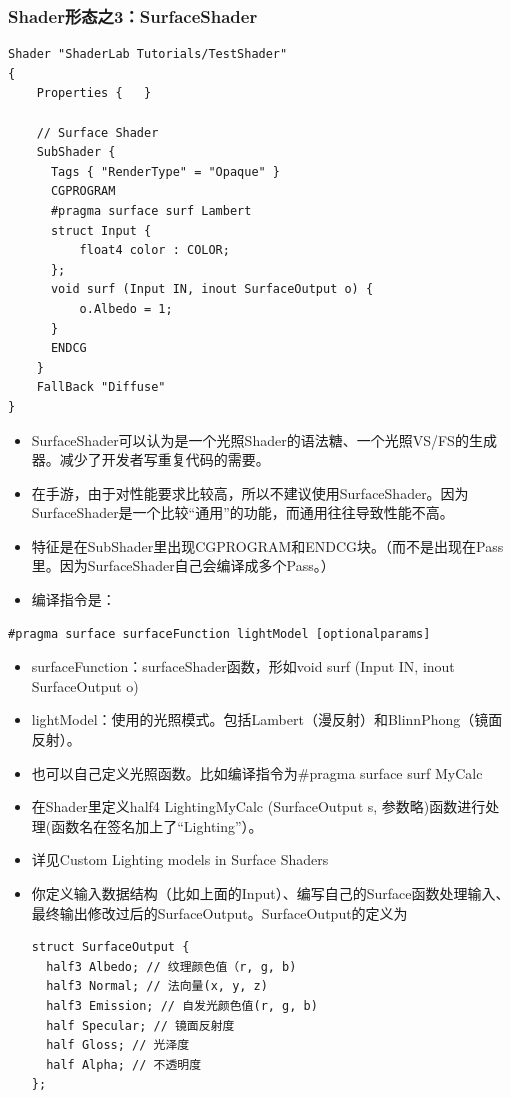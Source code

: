 \documentclass[9pt, b5paper]{article}
\begin{document}
\subsubsection{Shader形态之3：SurfaceShader}
\label{sec:org837e601}
\begin{verbatim}
Shader "ShaderLab Tutorials/TestShader"
{
    Properties {   }

    // Surface Shader
    SubShader {
      Tags { "RenderType" = "Opaque" }
      CGPROGRAM
      #pragma surface surf Lambert
      struct Input {
          float4 color : COLOR;
      };
      void surf (Input IN, inout SurfaceOutput o) {
          o.Albedo = 1;
      }
      ENDCG
    }
    FallBack "Diffuse"
}
\end{verbatim}
\begin{itemize}
\item SurfaceShader可以认为是一个光照Shader的语法糖、一个光照VS/FS的生成器。减少了开发者写重复代码的需要。
\item 在手游，由于对性能要求比较高，所以不建议使用SurfaceShader。因为SurfaceShader是一个比较“通用”的功能，而通用往往导致性能不高。
\item 特征是在SubShader里出现CGPROGRAM和ENDCG块。（而不是出现在Pass里。因为SurfaceShader自己会编译成多个Pass。）
\item 编译指令是：
\end{itemize}
\begin{verbatim}
#pragma surface surfaceFunction lightModel [optionalparams]
\end{verbatim}
\begin{itemize}
\item surfaceFunction：surfaceShader函数，形如void surf (Input IN, inout SurfaceOutput o)
\item lightModel：使用的光照模式。包括Lambert（漫反射）和BlinnPhong（镜面反射）。
\item 也可以自己定义光照函数。比如编译指令为\#pragma surface surf MyCalc
\item 在Shader里定义half4 LightingMyCalc (SurfaceOutput s, 参数略)函数进行处理(函数名在签名加上了“Lighting”）。
\item 详见Custom Lighting models in Surface Shaders
\end{itemize}
\begin{itemize}
\item 你定义输入数据结构（比如上面的Input）、编写自己的Surface函数处理输入、最终输出修改过后的SurfaceOutput。SurfaceOutput的定义为

\begin{verbatim}
struct SurfaceOutput {
  half3 Albedo; // 纹理颜色值（r, g, b)
  half3 Normal; // 法向量(x, y, z)
  half3 Emission; // 自发光颜色值(r, g, b)
  half Specular; // 镜面反射度
  half Gloss; // 光泽度
  half Alpha; // 不透明度
};
\end{verbatim}
\end{itemize}
\end{document}
